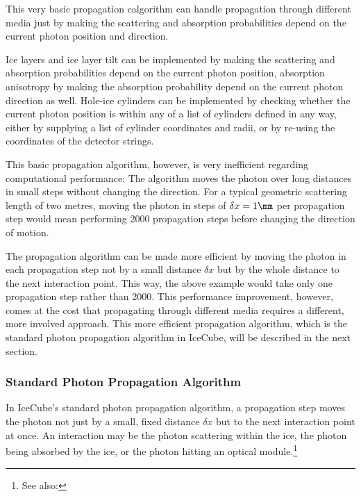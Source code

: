 \FloatBarrier

This very basic propagation calgorithm can handle propagation through different media just by making the scattering and absorption probabilities depend on the current photon position and direction.

Ice layers and ice layer tilt can be implemented by making the scattering and absorption probabilities depend on the current photon position, absorption anisotropy by making the absorption probability depend on the current photon direction as well. Hole-ice cylinders can be implemented by checking whether the current photon position is within any of a list of cylinders defined in any way, either by supplying a list of cylinder coordinates and radii, or by re-using the coordinates of the detector strings.

This basic propagation algorithm, however, is very inefficient regarding computational performance: The algorithm moves the photon over long distances in small steps without changing the direction. For a typical geometric scattering length of two metres, moving the photon in steps of $\delta x = 1\mm$ per propagation step would mean performing 2000 propagation steps before changing the direction of motion.

The propagation algorithm can be made more efficient by moving the photon in each propagation step not by a small distance $\delta x$ but by the whole distance to the next interaction point. This way, the above example would take only one propagation step rather than 2000. This performance improvement, however, comes at the cost that propagating through different media requires a different, more involved approach. This more efficient propagation algorithm, which is the standard photon propagation algorithm in IceCube, will be described in the next section.

\subsubsection{Standard Photon Propagation Algorithm}
\label{sec:standardphotonpropagationalgorithm}
\label{sec:standard_photon_propagation_algorithm}

In IceCube's standard photon propagation algorithm, a propagation step moves the photon not just by a small, fixed distance $\delta x$ but to the next interaction point at once. An interaction may be the photon scattering within the ice, the photon being absorbed by the ice, or the photon hitting an optical module.\footnote{See also: }

